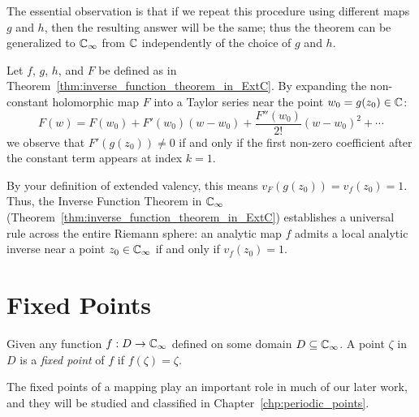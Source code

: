 The essential observation is that if we repeat this procedure using different
maps $g$ and $h$, then the resulting answer will be the same; thus the theorem
can be generalized to $\mathbb{C}_\infty$ from $\mathbb{C}$ independently of the choice of $g$ and
$h$.

\begin{remark}
    Let $f$, $g$, $h$, and $F$ be defined as in
    Theorem~\ref{thm:inverse_function_theorem_in_ExtC}. By expanding the
    non-constant holomorphic map $F$ into a Taylor series near the point $w_0 =
    g(z_0) \in \mathbb{C}$:
    \begin{equation*}
        F(w) = F(w_0) + F'(w_0)(w-w_0) + \frac{F''(w_0)}{2!}(w-w_0)^2 + \cdots
    \end{equation*}
    we observe that $F'(g(z_0)) \neq 0$ if and only if the first non-zero
    coefficient after the constant term appears at index $k=1$. 
    
    By your definition of extended valency, this means $v_F(g(z_0)) = v_f(z_0) =
    1$. Thus, the Inverse Function Theorem in $\mathbb{C}_\infty$
    (Theorem~\ref{thm:inverse_function_theorem_in_ExtC}) establishes a universal
    rule across the entire Riemann sphere: an analytic map $f$ admits a local
    analytic inverse near a point $z_0 \in \mathbb{C}_\infty$ if and only if $v_f(z_0) = 1$.
\end{remark}

\section{Fixed Points}
\label{sec:fixed_points}

\begin{definition}
    Given any function $f : D \to \mathbb{C}_\infty$ defined on some domain $D \subseteq
    \mathbb{C}_\infty$. A point $\zeta$ in $D$ is a \emph{fixed point} of $f$ if $f(\zeta) =
    \zeta$.
\end{definition}

The fixed points of a mapping play an important role in much of our later work,
and they will be studied and classified in Chapter~\ref{chp:periodic_points}.

